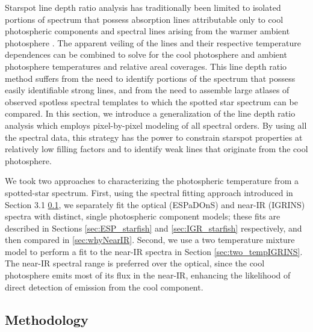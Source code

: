 \documentclass[twocolumn]{emulateapj}%
\begin{document}
Starspot line depth ratio analysis has traditionally been limited to isolated portions of spectrum that possess absorption lines attributable only to cool photospheric components and spectral lines arising from the warmer ambient photosphere \citep[\emph{e.g.}][]{neff95, oneal01}.  The apparent veiling of the lines and their respective temperature dependences can be combined to solve for the cool photosphere and ambient photosphere temperatures and relative areal coverages.  This line depth ratio method suffers from the need to identify portions of the spectrum that possess easily identifiable strong lines, and from the need to assemble large atlases of observed spotless spectral templates to which the spotted star spectrum can be compared.  In this section, we introduce a generalization of the line depth ratio analysis which employs pixel-by-pixel modeling of all spectral orders.  By using all the spectral data, this strategy has the power to constrain starspot properties at relatively low filling factors and to identify weak lines that originate from the cool photosphere.

We took two approaches to characterizing the photospheric temperature from a spotted-star spectrum.  First, 
using the spectral fitting approach introduced in Section 3.1 \ref{sec:methods}, we separately fit the optical (ESPaDOnS) and near-IR (IGRINS) spectra with distinct, single photospheric component models; these fits are described in Sections \ref{sec:ESP_starfish} and \ref{sec:IGR_starfish} respectively, and then compared in \ref{sec:whyNearIR}.
Second, we use a two temperature mixture model to perform a fit to the near-IR spectra in Section \ref{sec:two_tempIGRINS}.  The near-IR spectral range is preferred over the optical, since the cool photosphere emits most of its flux in the near-IR, enhancing the likelihood of direct detection of emission from the cool component.  


\subsection{Methodology}\label{sec:methods} 
\end{document}
